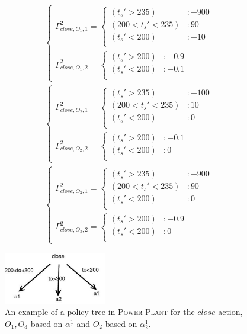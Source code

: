 \documentclass{article}
\begin{document}
\begin{align*}
\begin{cases}
\Gamma_{close,O_1,1}^2= 
\begin{cases}
(t_s'>235) &: -900 \\
(200<t_s'<235) &: 90 \\
(t_s'<200) &: -10 \\
\end{cases}
\\
\Gamma_{close,O_1,2}^2= 
\begin{cases}
(t_s'>200) &: -0.9 \\ 
(t_s'<200) &: -0.1 \\
\end{cases}
\end{cases}
\\
\begin{cases}
\Gamma_{close,O_2,1}^2= 
\begin{cases}
 (t_s'>235) &: -100 \\
(200<t_s'<235) &: 10 \\
(t_s'<200) &: 0 \\
\end{cases}
\\
\Gamma_{close,O_2,2}^2= 
\begin{cases}
 (t_s'>200) &: -0.1 \\
 (t_s'<200) &: 0 \\
\end{cases}
\end{cases}
\\
\begin{cases}
\Gamma_{close,O_3,1}^2= 
\begin{cases}
 (t_s'>235) &: -900 \\
 (200<t_s'<235) &: 90 \\
 (t_s'<200) &: 0 \\
\end{cases}
\\
\Gamma_{close,O_3,2}^2= 
\begin{cases}
 (t_s'>200) &: -0.9 \\
(t_s'<200) &: 0 \\
\end{cases}
\end{cases}
\end{align*}

\begin{figure}[t]
\begin{center}
\includegraphics[width=0.4\textwidth]{policy2.pdf}
\end{center}
\vspace{-3mm}
\caption{%
An example of a policy tree in \textsc{Power Plant}
for the $close$ action, $O_1,O_3$ based on $\alpha_1^1$ and $O_2$ based on $\alpha_2^1$.} 
\end{figure}
\end{document}
